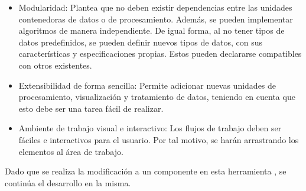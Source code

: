 \begin{itemize}
	\item Modularidad: Plantea que no deben existir dependencias entre las unidades contenedoras de datos o de procesamiento. Además, se pueden implementar algoritmos de manera independiente. De igual forma, al no tener tipos de datos predefinidos, se pueden definir nuevos tipos de datos, con sus características y especificaciones propias. Estos pueden declararse compatibles con otros existentes.
	\item	Extensibilidad de forma sencilla: Permite adicionar nuevas unidades de procesamiento, visualización y tratamiento de datos, teniendo en cuenta que esto debe ser una tarea fácil de realizar.
	\item	Ambiente de trabajo visual e interactivo: Los flujos de trabajo deben ser fáciles e interactivos para el usuario. Por tal motivo, se harán arrastrando los elementos al área de trabajo.
\end{itemize}

Dado que se realiza la modificación a un componente en esta herramienta \citep{Carrazana2022}, se continúa el desarrollo en la misma.


